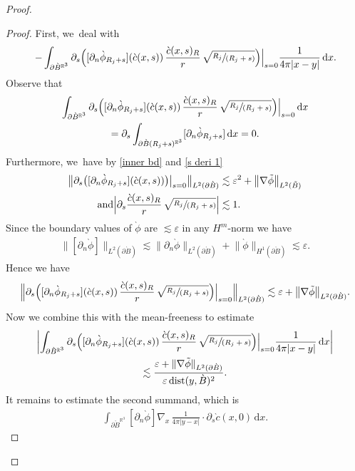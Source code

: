 \documentclass[10pt]{amsart}
\let\epsilon\varepsilon
\newcommand{\spfrac}[2]{\sfrac{#1}{(#2)}}
\theoremstyle{definition}
\DeclareMathOperator{\dist}{dist}
\newcommand\R{\mathbb{R}}
\newcommand\anorm[1]{\lVert #1\rVert}
\newcommand\bnorm[1]{\bigl\lVert #1\bigr\rVert}
\newcommand\Bnorm[1]{\Bigl\lVert #1\Bigr\rVert}
\newcommand\eq{=}
\newcommand\dd{\,\mathrm{d}}
\newcommand\dx{\dd x}
\let\de\partial
\let\eps\epsilon
\begin{document}
\begin{proof}
\begin{proof}
First, we~deal with
\begin{align*}
-\int_{\de\grave{B}^{\R^3}}\de_s\Bigl([\de_n\grave{\phi}_{R_j+s}](\grave{c}(x,s))\,\frac{\grave{c}(x,s)_R}{r}\,\sqrt{\spfrac{R_j}{R_j+s}} \Bigr) \Big|_{s=0}\frac{1}{4\pi|x-y|}\dx.
\end{align*}
Observe that
\begin{multline*}
\int_{\de\grave{B}^{\R^3}}\de_s \Bigl([\de_n\grave{\phi}_{R_j+s}](\grave{c}(x,s))\,\frac{\grave{c}(x,s)_R}{r}\,\sqrt{\spfrac{R_j}{R_j+s}} \Bigr) \Big|_{s=0}\dx\\
= \de_s \int_{\de\grave{B}(R_j+s)^{\R^3}}[\de_n\grave{\phi}_{R_j+s}]\dx\eq 0.
\end{multline*}
Furthermore, we~have by \eqref{inner bd} and \eqref{s deri 1}
\begin{align*}
\bnorm{\de_s\bigl([\de_n\grave{\phi}_{R_j+s}](\grave{c}(x,s))\bigr)\big|_{s=0}}_{L^2(\de\grave{B})}&\lesssim \eps^2+\bnorm{\nabla\tilde{\phi}}_{L^2(\tilde{B})}\\
\tag*{and}
\Bigl|\de_s\frac{\grave{c}(x,s)_R}{r}\,\sqrt{\spfrac{R_j}{R_j+s}} \Bigr|&\lesssim 1.
\end{align*}
Since the boundary values of $\grave{\phi}$ are $\lesssim \eps$ in any $H^m$-norm we have
\begin{align}
\bnorm{[\de_n\grave{\phi}]}_{L^2(\de\grave{B})}\lesssim \bnorm{\de_n\grave{\phi}}_{L^2(\de\grave{B})}+\bnorm{\grave{\phi}}_{H^1(\de\grave{B})}\lesssim \eps.\label{est jump}
\end{align}
Hence we have
\begin{align*}
\Bnorm{\de_s \Bigl([\de_n\grave{\phi}_{R_j+s}](\grave{c}(x,s))\,\frac{\grave{c}(x,s)_R}{r}\,\sqrt{\spfrac{R_j}{R_j+s}} \Bigr) \Big|_{s=0}}_{L^2(\de\grave{B})}\lesssim \eps+\bnorm{\nabla\tilde{\phi}}_{L^2(\de\grave{B})}.
\end{align*}
Now we combine this with the mean-freeness to estimate
\begin{multline*}
\biggl|\int_{\de\grave{B}^{\R^3}}\de_s \Bigl([\de_n\grave{\phi}_{R_j+s}](\grave{c}(x,s))\,\frac{\grave{c}(x,s)_R}{r}\,\sqrt{\spfrac{R_j}{R_j+s}} \Bigr) \Big|_{s=0}\frac{1}{4\pi|x-y|}\dx\biggr|\\
\lesssim \frac{\eps+\anorm{\nabla\tilde{\phi}}_{L^2(\de\grave{B})}}{\eps\dist(y,\grave{B})^2}.
\end{multline*}
It remains to estimate the second summand, which is
\begin{align*}
\int_{\de\grave{B}^{\R^3}}[\de_n\grave{\phi}]\nabla_x\,\frac{1}{4\pi|y-x|}\cdot \de_s\grave{c}(x,0)\dx.

\end{align*}
\end{proof}
\end{proof}
\end{document}
